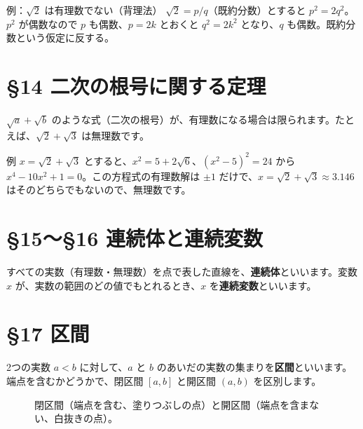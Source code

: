 \documentclass[a4paper,11pt,openany]{ltjsbook}
\begin{document}
\begin{examplebox}{例：$\sqrt2$ は有理数でない（背理法）}
$\sqrt2=p/q$（既約分数）とすると $p^2=2q^2$。$p^2$ が偶数なので $p$ も偶数、$p=2k$ とおくと $q^2=2k^2$ となり、$q$ も偶数。既約分数という仮定に反する。
\end{examplebox}

\section{§14 二次の根号に関する定理}

$\sqrt a+\sqrt b$ のような式（二次の根号）が、有理数になる場合は限られます。たとえば、$\sqrt2+\sqrt3$ は無理数です。

\begin{examplebox}{例}
$x=\sqrt2+\sqrt3$ とすると、$x^2=5+2\sqrt6$、$(x^2-5)^2=24$ から $x^4-10x^2+1=0$。この方程式の有理数解は $\pm1$ だけで、$x=\sqrt2+\sqrt3\approx3.146$ はそのどちらでもないので、無理数です。
\end{examplebox}

\section{§15〜§16 連続体と連続変数}

すべての実数（有理数・無理数）を点で表した直線を、\textbf{連続体}といいます。変数 $x$ が、実数の範囲のどの値でもとれるとき、$x$ を\textbf{連続変数}といいます。

\section{§17 区間}

2つの実数 $a<b$ に対して、$a$ と $b$ のあいだの実数の集まりを\textbf{区間}といいます。端点を含むかどうかで、閉区間 $[a,b]$ と開区間 $(a,b)$ を区別します。

\begin{figure}[htbp]
\centering
{}
\caption{閉区間（端点を含む、塗りつぶしの点）と開区間（端点を含まない、白抜きの点）。}
\end{figure}
\end{document}
